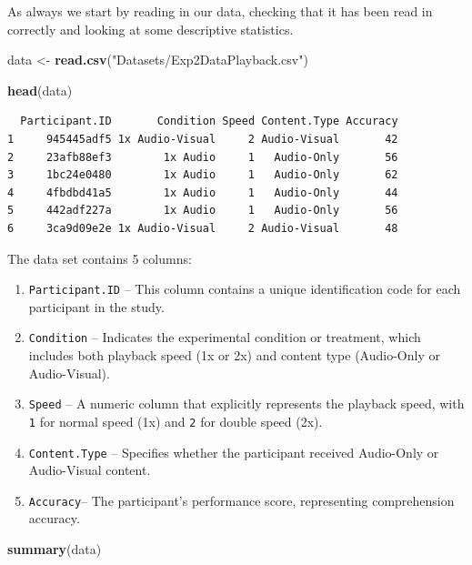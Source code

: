 \documentclass[
  letterpaper,
]{book}
\newenvironment{Shaded}{\begin{snugshade}}{\end{snugshade}}
\newcommand{\FunctionTok}[1]{\textcolor[rgb]{0.13,0.29,0.53}{\textbf{#1}}}
\newcommand{\NormalTok}[1]{#1}
\newcommand{\OtherTok}[1]{\textcolor[rgb]{0.56,0.35,0.01}{#1}}
\newcommand{\StringTok}[1]{\textcolor[rgb]{0.31,0.60,0.02}{#1}}
\providecommand{\tightlist}{%
  \setlength{\itemsep}{0pt}\setlength{\parskip}{0pt}}\usepackage{longtable,booktabs,array}
\begin{document}
As always we start by reading in our data, checking that it has been
read in correctly and looking at some descriptive statistics.

\begin{Shaded}
\begin{Highlighting}[]
\NormalTok{data }\OtherTok{\textless{}{-}} \FunctionTok{read.csv}\NormalTok{(}\StringTok{"Datasets/Exp2DataPlayback.csv"}\NormalTok{)}

\FunctionTok{head}\NormalTok{(data)}
\end{Highlighting}
\end{Shaded}

\begin{verbatim}
  Participant.ID       Condition Speed Content.Type Accuracy
1     945445adf5 1x Audio-Visual     2 Audio-Visual       42
2     23afb88ef3        1x Audio     1   Audio-Only       56
3     1bc24e0480        1x Audio     1   Audio-Only       62
4     4fbdbd41a5        1x Audio     1   Audio-Only       44
5     442adf227a        1x Audio     1   Audio-Only       56
6     3ca9d09e2e 1x Audio-Visual     2 Audio-Visual       48
\end{verbatim}

The data set contains 5 columns:

\begin{enumerate}
\def\labelenumi{\arabic{enumi}.}
\tightlist
\item
  \texttt{Participant.ID} -- This column contains a unique
  identification code for each participant in the study.\\
\item
  \texttt{Condition} -- Indicates the experimental condition or
  treatment, which includes both playback speed (1x or 2x) and content
  type (Audio-Only or Audio-Visual).\\
\item
  \texttt{Speed} -- A numeric column that explicitly represents the
  playback speed, with \texttt{1} for normal speed (1x) and \texttt{2}
  for double speed (2x).\\
\item
  \texttt{Content.Type} -- Specifies whether the participant received
  Audio-Only or Audio-Visual content.\\
\item
  \texttt{Accuracy}-- The participant's performance score, representing
  comprehension accuracy.
\end{enumerate}

\begin{Shaded}
\begin{Highlighting}[]
\FunctionTok{summary}\NormalTok{(data)}
\end{Highlighting}
\end{Shaded}
\end{document}
